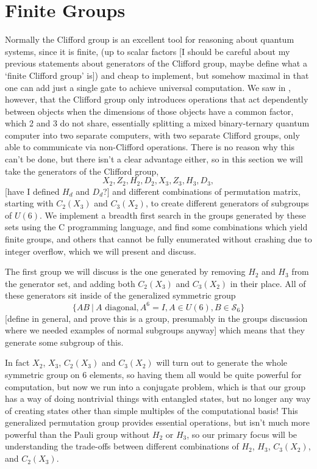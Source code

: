 \section{Finite Groups}
Normally the Clifford group is an excellent tool for reasoning about quantum systems, since it is finite, (up to scalar factors [I should be careful about my previous statements about generators of the Clifford group, maybe define what a `finite Clifford group' is]) and cheap to implement, but somehow maximal in that one can add just a single gate to achieve universal computation. We saw in \cite{tolar-clifford}, however, that the Clifford group only introduces operations that act dependently between objects when the dimensions of those objects have a common factor, which 2 and 3 do not share, essentially splitting a mixed binary-ternary quantum computer into two separate computers, with two separate Clifford groups, only able to communicate via non-Clifford operations. There is no reason why this can't be done, but there isn't a clear advantage either, so in this section we will take the generators of the Clifford group,
\[X_2, Z_2, H_2, D_2, X_3, Z_3, H_3, D_3,\]
[have I defined $H_d$ and $D_d$?]
and different combinations of permutation matrix, starting with $C_2(X_3)$ and $C_3(X_2)$, to create different generators of subgroups of $U(6)$. We implement a breadth first search in the groups generated by these sets using the C programming language, and find some combinations which yield finite groups, and others that cannot be fully enumerated without crashing due to integer overflow, which we will present and discuss.

The first group we will discuss is the one generated by removing $H_2$ and $H_3$ from the generator set, and adding both $C_2(X_3)$ and $C_3(X_2)$ in their place. All of these generators sit inside of the generalized symmetric group
\[\{AB\ |\ A\text{\ diagonal}, A^6 = I, A \in U(6), B \in \mathcal{S}_6\}\]
[define in general, and prove this is a group, presumably in the groups discussion where we needed examples of normal subgroups anyway]
which means that they generate some subgroup of this.

In fact $X_2$, $X_3$, $C_2(X_3)$ and $C_3(X_2)$ will turn out to generate the whole symmetric group on 6 elements, so having them all would be quite powerful for computation, but now we run into a conjugate problem, which is that our group has a way of doing nontrivial things with entangled states, but no longer any way of creating states other than simple multiples of the computational basis! This generalized permutation group provides essential operations, but isn't much more powerful than the Pauli group without $H_2$ or $H_3$, so our primary focus will be understanding the trade-offs between different combinations of $H_2$, $H_3$, $C_3(X_2)$, and $C_2(X_3)$.
